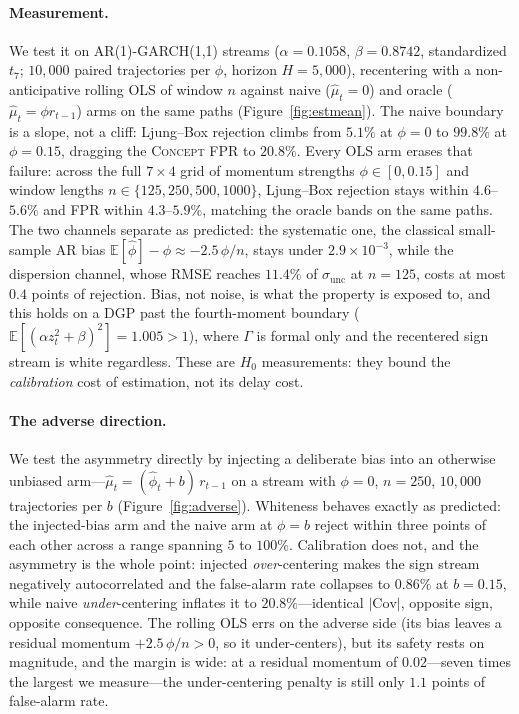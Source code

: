 \documentclass[sigconf,anonymous,review]{acmart}
\theoremstyle{acmdefinition}
\begin{document}
\paragraph{Measurement.}
We test it on AR(1)-GARCH(1,1) streams ($\alpha = 0.1058$, $\beta = 0.8742$, standardized $t_7$; $10{,}000$ paired trajectories per $\phi$, horizon $H = 5{,}000$), recentering with a non-anticipative rolling OLS of window $n$ against naive ($\hat{\mu}_t = 0$) and oracle ($\hat{\mu}_t = \phi r_{t-1}$) arms on the same paths (Figure~\ref{fig:estmean}). The naive boundary is a slope, not a cliff: Ljung--Box rejection climbs from $5.1\%$ at $\phi = 0$ to $99.8\%$ at $\phi = 0.15$, dragging the \textsc{Concept} FPR to $20.8\%$. Every OLS arm erases that failure: across the full $7 \times 4$ grid of momentum strengths $\phi \in [0, 0.15]$ and window lengths $n \in \{125, 250, 500, 1000\}$, Ljung--Box rejection stays within $4.6$--$5.6\%$ and FPR within $4.3$--$5.9\%$, matching the oracle bands on the same paths. The two channels separate as predicted: the systematic one, the classical small-sample AR bias $\mathbb{E}[\hat{\phi}] - \phi \approx -2.5\,\phi/n$, stays under $2.9 \times 10^{-3}$, while the dispersion channel, whose RMSE reaches $11.4\%$ of $\sigma_{\mathrm{unc}}$ at $n = 125$, costs at most $0.4$ points of rejection. Bias, not noise, is what the property is exposed to, and this holds on a DGP past the fourth-moment boundary ($\mathbb{E}[(\alpha z_t^2 + \beta)^2] = 1.005 > 1$), where $\Gamma$ is formal only and the recentered sign stream is white regardless. These are $H_0$ measurements: they bound the \emph{calibration} cost of estimation, not its delay cost.

\paragraph{The adverse direction.}
We test the asymmetry directly by injecting a deliberate bias into an otherwise unbiased arm---$\hat{\mu}_t = (\hat{\phi}_t + b)\,r_{t-1}$ on a stream with $\phi = 0$, $n = 250$, $10{,}000$ trajectories per $b$ (Figure~\ref{fig:adverse}). Whiteness behaves exactly as predicted: the injected-bias arm and the naive arm at $\phi = b$ reject within three points of each other across a range spanning $5$ to $100\%$. Calibration does not, and the asymmetry is the whole point: injected \emph{over}-centering makes the sign stream negatively autocorrelated and the false-alarm rate collapses to $0.86\%$ at $b = 0.15$, while naive \emph{under}-centering inflates it to $20.8\%$---identical $|\mathrm{Cov}|$, opposite sign, opposite consequence. The rolling OLS errs on the adverse side (its bias leaves a residual momentum $+2.5\,\phi/n > 0$, so it under-centers), but its safety rests on magnitude, and the margin is wide: at a residual momentum of $0.02$---seven times the largest we measure---the under-centering penalty is still only $1.1$ points of false-alarm rate.
\end{document}
